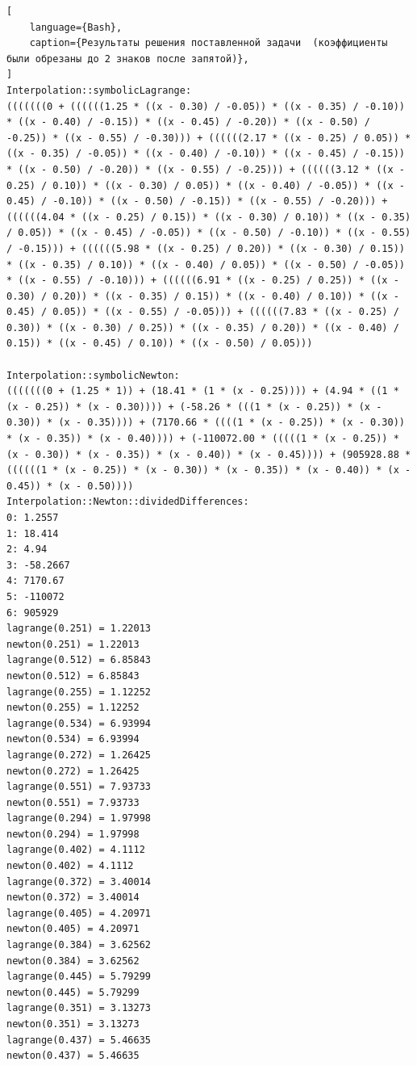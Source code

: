 \documentclass{article}
\begin{document}
\begin{lstlisting}[
    language={Bash},
    caption={Результаты решения поставленной задачи  (коэффициенты были обрезаны до 2 знаков после запятой)},
]
Interpolation::symbolicLagrange:
(((((((0 + ((((((1.25 * ((x - 0.30) / -0.05)) * ((x - 0.35) / -0.10)) * ((x - 0.40) / -0.15)) * ((x - 0.45) / -0.20)) * ((x - 0.50) / -0.25)) * ((x - 0.55) / -0.30))) + ((((((2.17 * ((x - 0.25) / 0.05)) * ((x - 0.35) / -0.05)) * ((x - 0.40) / -0.10)) * ((x - 0.45) / -0.15)) * ((x - 0.50) / -0.20)) * ((x - 0.55) / -0.25))) + ((((((3.12 * ((x - 0.25) / 0.10)) * ((x - 0.30) / 0.05)) * ((x - 0.40) / -0.05)) * ((x - 0.45) / -0.10)) * ((x - 0.50) / -0.15)) * ((x - 0.55) / -0.20))) + ((((((4.04 * ((x - 0.25) / 0.15)) * ((x - 0.30) / 0.10)) * ((x - 0.35) / 0.05)) * ((x - 0.45) / -0.05)) * ((x - 0.50) / -0.10)) * ((x - 0.55) / -0.15))) + ((((((5.98 * ((x - 0.25) / 0.20)) * ((x - 0.30) / 0.15)) * ((x - 0.35) / 0.10)) * ((x - 0.40) / 0.05)) * ((x - 0.50) / -0.05)) * ((x - 0.55) / -0.10))) + ((((((6.91 * ((x - 0.25) / 0.25)) * ((x - 0.30) / 0.20)) * ((x - 0.35) / 0.15)) * ((x - 0.40) / 0.10)) * ((x - 0.45) / 0.05)) * ((x - 0.55) / -0.05))) + ((((((7.83 * ((x - 0.25) / 0.30)) * ((x - 0.30) / 0.25)) * ((x - 0.35) / 0.20)) * ((x - 0.40) / 0.15)) * ((x - 0.45) / 0.10)) * ((x - 0.50) / 0.05)))

Interpolation::symbolicNewton:
(((((((0 + (1.25 * 1)) + (18.41 * (1 * (x - 0.25)))) + (4.94 * ((1 * (x - 0.25)) * (x - 0.30)))) + (-58.26 * (((1 * (x - 0.25)) * (x - 0.30)) * (x - 0.35)))) + (7170.66 * ((((1 * (x - 0.25)) * (x - 0.30)) * (x - 0.35)) * (x - 0.40)))) + (-110072.00 * (((((1 * (x - 0.25)) * (x - 0.30)) * (x - 0.35)) * (x - 0.40)) * (x - 0.45)))) + (905928.88 * ((((((1 * (x - 0.25)) * (x - 0.30)) * (x - 0.35)) * (x - 0.40)) * (x - 0.45)) * (x - 0.50))))
Interpolation::Newton::dividedDifferences: 
0: 1.2557
1: 18.414
2: 4.94
3: -58.2667
4: 7170.67
5: -110072
6: 905929
lagrange(0.251) = 1.22013
newton(0.251) = 1.22013
lagrange(0.512) = 6.85843
newton(0.512) = 6.85843
lagrange(0.255) = 1.12252
newton(0.255) = 1.12252
lagrange(0.534) = 6.93994
newton(0.534) = 6.93994
lagrange(0.272) = 1.26425
newton(0.272) = 1.26425
lagrange(0.551) = 7.93733
newton(0.551) = 7.93733
lagrange(0.294) = 1.97998
newton(0.294) = 1.97998
lagrange(0.402) = 4.1112
newton(0.402) = 4.1112
lagrange(0.372) = 3.40014
newton(0.372) = 3.40014
lagrange(0.405) = 4.20971
newton(0.405) = 4.20971
lagrange(0.384) = 3.62562
newton(0.384) = 3.62562
lagrange(0.445) = 5.79299
newton(0.445) = 5.79299
lagrange(0.351) = 3.13273
newton(0.351) = 3.13273
lagrange(0.437) = 5.46635
newton(0.437) = 5.46635
\end{lstlisting}
\end{document}
